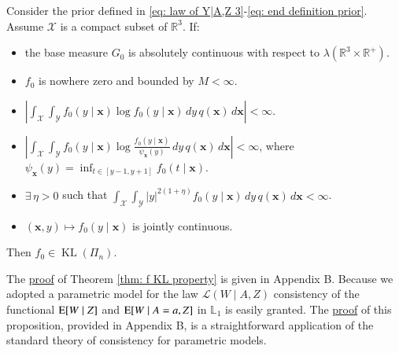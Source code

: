 \begin{theorem}\label{thm: f KL property}
Consider the prior defined in \eqref{eq: law of Y|A,Z 3}-\eqref{eq: end definition prior}. Assume $\mathcal{X}$ is a compact subset of $\mathbb{R}^3$. If:
\begin{itemize}
    \item[A0.] the base measure $G_0$ is absolutely continuous with respect to $\lambda\left(\mathbb{R}^3 \times \mathbb{R}^{+}\right)$.
    \item[A1.] $f_0$ is nowhere zero and bounded by $M<\infty$.
    \item[A2.] $\left|\int_{\mathcal{X}} \int_{\mathcal{Y}} f_0(y \mid \boldsymbol{x}) \log f_0(y \mid \boldsymbol{x}) \, d y \, q(\boldsymbol{x}) \, d \boldsymbol{x} \right|<\infty$.
    \item[A3.] $\left|\int_{\mathcal{X}} \int_{\mathcal{Y}} f_0(y \mid \boldsymbol{x}) \log \frac{f_0(y \mid \boldsymbol{x})}{\psi_{\boldsymbol{x}}(y)} \, d y \, q(\boldsymbol{x}) \, d \boldsymbol{x}\right|<\infty$, where $\psi_{\boldsymbol{x}}(y)=\inf_{t \in[y-1, y+1]} f_0(t \mid \boldsymbol{x})$.
    \item[A4.] $\exists \, \eta>0$ such that $\int_{\mathcal{X}} \int_{\mathcal{Y}} |y|^{2(1+\eta)} f_0(y \mid \boldsymbol{x}) \, d y \, q(\boldsymbol{x}) \, d \boldsymbol{x}<\infty$.
    \item[A5.] $(\boldsymbol{x}, y) \mapsto f_0(y \mid \boldsymbol{x})$ is jointly continuous.
\end{itemize}
Then $f_0 \in \operatorname{KL}\left(\Pi_n\right)$.
\end{theorem}

The \hyperlink{proof of thm KL property}{proof} of Theorem \ref{thm: f KL property} is given in Appendix B. Because we adopted a parametric model for the law $\mathcal{L}(W \mid A,Z)$ consistency of the functional $\mathrm{E}[W \mid Z]$ and $\mathrm{E} [W \mid A=a, Z]$ in $\mathbb{L}_1$ is easily granted. The \hyperlink{proof of prop para}{proof} of this proposition, provided in Appendix B, is a straightforward application of the standard theory of consistency for parametric models. 

